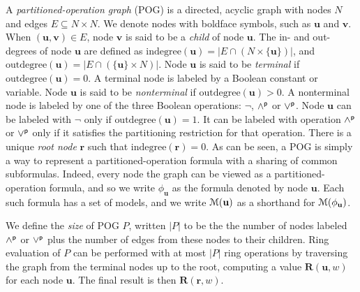 \documentclass[letterpaper,USenglish,cleveref, autoref, thm-restate]{lipics-v2021}
\newcommand{\pand}{\mathbin{\land^{\sf p}}}
\newcommand{\por}{\mathbin{\lor^{\sf p}}}
\newcommand{\boolnot}{\neg}
\newcommand{\rep}{\textbf{R}}
\newcommand{\modelset}{{\cal M}}
\newcommand{\indegree}{\textrm{indegree}}
\newcommand{\outdegree}{\textrm{outdegree}}
\newcommand{\makenode}[1]{\mathbf{#1}}
\newcommand{\nodeu}{\makenode{u}}
\newcommand{\nodev}{\makenode{v}}
\newcommand{\noder}{\makenode{r}}
\begin{document}
A {\em partitioned-operation graph} (POG) is a directed, acyclic graph
with nodes $N$ and edges $E \subseteq N \times N$.  We denote nodes with boldface symbols, such as $\nodeu$ and $\nodev$.
When $(\nodeu,\nodev) \in E$,
node $\nodev$ is said to be a {\em child} of node $\nodeu$.
The in- and out-degrees of node $\nodeu$ are defined as $\indegree(\nodeu) = | E \cap (N \times \{\nodeu\}) |$, and
$\outdegree(\nodeu) = | E \cap (\{\nodeu\} \times N) |$.
Node $\nodeu$ is said to be {\em terminal} if $\outdegree(\nodeu) = 0$.  A terminal node is labeled by a Boolean constant or variable.
Node $\nodeu$ is said to be {\em nonterminal} if $\outdegree(\nodeu) > 0$.
A nonterminal node is labeled by one of the three Boolean operations: $\boolnot$, $\pand$ or $\por$.
Node $\nodeu$ can be labeled with $\boolnot$ only if $\outdegree(\nodeu) = 1$.
It can be labeled with operation $\pand$ or $\por$ only if it satisfies the partitioning restriction for that operation.
There is a unique {\em root node} $\noder$ such that $\indegree(\noder) = 0$.
As can be seen, a POG is simply a way to represent a partitioned-operation
formula with a sharing of common subformulas.  Indeed, every node the graph can be viewed as a partitioned-operation formula, and so we write
$\phi_{\nodeu}$ as the formula denoted by node $\nodeu$.
Each such formula has a set of models, and we write $\modelset(\nodeu)$ as a shorthand for $\modelset(\phi_{\nodeu})$.

We define the {\em size} of POG $P$, written $|P|$ to be the
the number of nodes labeled $\pand$ or $\por$ plus the number of edges from these nodes to their children.  Ring
evaluation of $P$ can be performed with at most $|P|$ ring
operations by traversing the graph from the terminal nodes up to
the root, computing a value $\rep(\nodeu, w)$ for each node $\nodeu$.
The final result is then $\rep(\noder, w)$.
\end{document}
